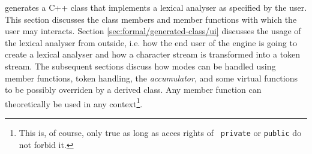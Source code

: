 {\Quex} generates a C++ class that implements a lexical analyser as specified
by the user. This section discusses the class members and member functions with
which the user may interacts. Section \ref{sec:formal/generated-class/ui}
discusses the usage of the lexical analyser from outside, i.e. how the end
user of the engine is going to create a lexical analyser and how a character
stream is transformed into a token stream. The subsequent sections discuss how
modes can be handled using member functions, token handling, the {\it
accumulator}, and some virtual functions to be possibly overriden by a derived
class. Any member function can theoretically be used in any
context\footnote{This is, of course, only true as long as acces rights of {\tt
private} or {\tt public} do not forbid it.}.



